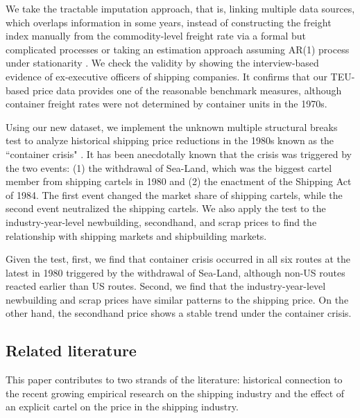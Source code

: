 \documentclass[11pt]{article}
\begin{document}
We take the tractable imputation approach, that is, linking multiple data sources, which overlaps information in some years, instead of constructing the freight index manually from the commodity-level freight rate via a formal but complicated processes or taking an estimation approach assuming AR(1) process under stationarity \citep{jeon2017learning}. We check the validity by showing the interview-based evidence of ex-executive officers of shipping companies. It confirms that our TEU-based price data provides one of the reasonable benchmark measures, although container freight rates were not determined by container units in the 1970s.

Using our new dataset, we implement the unknown multiple structural breaks test \citep{bai1998estimating,bai2003computation} to analyze historical shipping price reductions in the 1980s known as the ``container crisis" \citep{broeze2002globalisation}. It has been anecdotally known that the crisis was triggered by the two events: (1) the withdrawal of Sea-Land, which was the biggest cartel member from shipping cartels in 1980 and (2) the enactment of the Shipping Act of 1984. The first event changed the market share of shipping cartels, while the second event neutralized the shipping cartels. We also apply the test to the industry-year-level newbuilding, secondhand, and scrap prices to find the relationship with shipping markets and shipbuilding markets.

Given the test, first, we find that container crisis occurred in all six routes at the latest in 1980 triggered by the withdrawal of Sea-Land, although non-US routes reacted earlier than US routes. Second, we find that the industry-year-level newbuilding and scrap prices have similar patterns to the shipping price. On the other hand, the secondhand price shows a stable trend under the container crisis.


\subsection{Related literature}\label{subsec:litereture}

This paper contributes to two strands of the literature: historical connection to the recent growing empirical research on the shipping industry and the effect of an explicit cartel on the price in the shipping industry.
\end{document}
